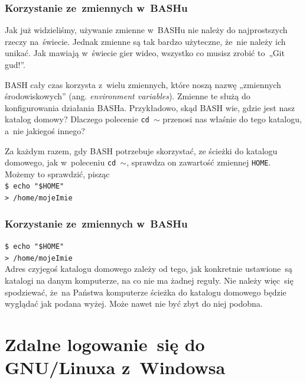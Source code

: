 \documentclass[10pt,t]{beamer}
\begin{document}
\begin{frame}
  \frametitle{Korzystanie ze~zmiennych w~BASHu}


  Jak już widzieliśmy, używanie zmienne w~BASHu nie należy do najprostszych
  rzeczy na~świecie. Jednak zmienne są tak bardzo użyteczne, że~nie należy
  ich unikać. Jak mawiają w~świecie gier wideo, wszystko co musisz zrobić
  to~„Git gud!”.

  BASH cały czas korzysta z~wielu zmiennych, które noszą nazwę „zmiennych
  środowiskowych” (ang. \textit{environment variables}). Zmienne te służą
  do konfigurowania działania BASHa. Przykładowo, skąd BASH wie, gdzie
  jest nasz katalog domowy? Dlaczego polecenie \texttt{cd $\sim$}
  przenosi nas właśnie do tego katalogu, a~nie jakiegoś innego?

  Za każdym razem, gdy BASH potrzebuje skorzystać, ze ścieżki do katalogu
  domowego, jak w~poleceniu \texttt{cd $\sim$}, sprawdza on zawartość
  zmiennej \texttt{HOME}. Możemy to sprawdzić, pisząc \\
  \texttt{\$ echo "\$HOME"} \\
  \texttt{> /home/mojeImie}

\end{frame}





\begin{frame}
  \frametitle{Korzystanie ze~zmiennych w~BASHu}


  \texttt{\$ echo "\$HOME"} \\
  \texttt{> /home/mojeImie} \\
  Adres czyjegoś katalogu domowego zależy od tego, jak konkretnie
  ustawione~są katalogi na danym komputerze, na co nie ma żadnej reguły.
  Nie należy więc~się spodziewać, że~na Państwa komputerze ścieżka do
  katalogu domowego będzie wyglądać jak podana wyżej. Może nawet nie być
  zbyt do niej podobna.

\end{frame}





\section{Zdalne logowanie~się do GNU/Linuxa z~Windowsa}
\end{document}
